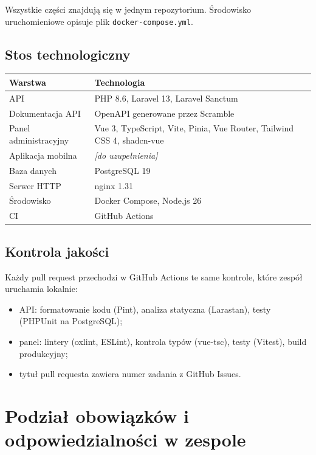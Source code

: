 \documentclass[a4paper,12pt]{article}
\begin{document}
Wszystkie części znajdują się w jednym repozytorium. Środowisko uruchomieniowe opisuje plik
\texttt{docker-compose.yml}.

\subsection{Stos technologiczny}

\begin{tabularx}{\textwidth}{@{}lX@{}}
  \toprule
  \textbf{Warstwa} & \textbf{Technologia} \\
  \midrule
  API & PHP 8.6, Laravel 13, Laravel Sanctum \\
  Dokumentacja API & OpenAPI generowane przez Scramble \\
  Panel administracyjny & Vue 3, TypeScript, Vite, Pinia, Vue Router, Tailwind CSS 4, shadcn-vue \\
  Aplikacja mobilna & \textit{[do uzupełnienia]} \\
  Baza danych & PostgreSQL 19 \\
  Serwer HTTP & nginx 1.31 \\
  Środowisko & Docker Compose, Node.js 26 \\
  CI & GitHub Actions \\
  \bottomrule
\end{tabularx}

\subsection{Kontrola jakości}

Każdy pull request przechodzi w GitHub Actions te same kontrole, które zespół uruchamia lokalnie:

\begin{itemize}
  \item API: formatowanie kodu (Pint), analiza statyczna (Larastan), testy (PHPUnit na PostgreSQL);
  \item panel: lintery (oxlint, ESLint), kontrola typów (vue-tsc), testy (Vitest), build produkcyjny;
  \item tytuł pull requesta zawiera numer zadania z GitHub Issues.
\end{itemize}

\newpage

\section{Podział obowiązków i odpowiedzialności w zespole}
\end{document}
